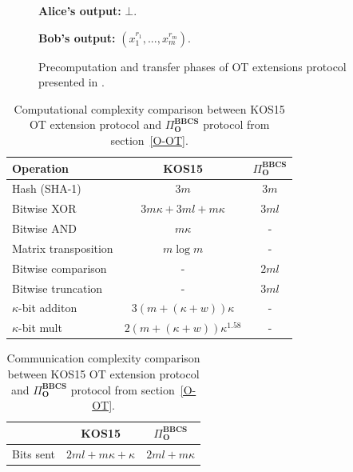 \begin{figure}
\begin{tcolorbox}
    \textbf{Alice's output:} $\bot$.
    
    \textbf{Bob's output:} $(x^{r_1}_1, ..., x^{r_m}_m)$.

        
        \end{tcolorbox}
    \caption{Precomputation and transfer phases of OT extensions protocol presented in \cite{KOS15}.}
    \label{fig:K15Protocol}
\end{figure}

\begin{table}
\centering
\begin{tabular}{lcc}
\toprule
Operation & KOS15 & $\Pi^{\textbf{BBCS}}_{\textbf{O}}$ \\
\midrule
Hash (SHA-1)    & $3m$              & $3m$ \\ 
Bitwise XOR      & $3 m\kappa + 3ml + m\kappa$             & $3ml $  \\ 
Bitwise AND  & $m\kappa$              & -           \\ 
Matrix transposition & $m\log m$              & -           \\ 
Bitwise comparison & -             & $2ml$           \\ 
Bitwise truncation & -            & $3ml$           \\ 
$\kappa$-bit additon & $3(m + (\kappa + w))\kappa$ & - \\ 
$\kappa$-bit mult & $2(m + (\kappa + w))\kappa^{1.58}$ & - \\ 
\bottomrule
\end{tabular}
\caption{Computational complexity comparison between KOS15 \cite{KOS15} OT extension protocol and $\Pi^{\textbf{BBCS}}_{\textbf{O}}$ protocol from section~\ref{O-OT}.}
\label{table:complexity}
\end{table}

\begin{table}[h!]
\centering
\begin{tabular}{lcc}
\toprule
 & KOS15 & $\Pi^{\textbf{BBCS}}_{\textbf{O}}$  \\
\midrule
\multicolumn{1}{l}{Bits sent }   & $2ml  + m\kappa + \kappa$   & $2ml + m\kappa $  \\
\bottomrule
\end{tabular}
\caption{Communication complexity comparison between KOS15 \cite{KOS15} OT extension protocol and $\Pi^{\textbf{BBCS}}_{\textbf{O}}$ protocol from section~\ref{O-OT}.}
\label{table:communication}
\end{table}

